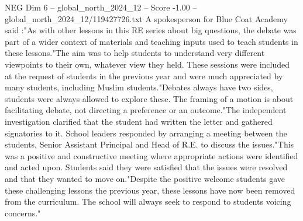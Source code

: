 \begin{textsample}{NEG Dim 6 – global\_north\_2024\_12 – Score -1.00 – global\_north\_2024\_12/119427726.txt}
A spokesperson for Blue Coat Academy said :"As with other lessons in this RE series about big questions, the debate was part of a wider context of materials and teaching inputs used to teach students in these lessons."The aim was to help students to understand very different viewpoints to their own, whatever view they held.
These sessions were included at the request of students in the previous year and were much appreciated by many students, including Muslim students."Debates always have two sides, students were always allowed to explore these.
The framing of a motion is about facilitating debate, not directing a preference or an outcome."The independent investigation clarified that the student had written the letter and gathered signatories to it.
School leaders responded by arranging a meeting between the students, Senior Assistant Principal and Head of R.E. to discuss the issues."This was a positive and constructive meeting where appropriate actions were identified and acted upon.
Students said they were satisfied that the issues were resolved and that they wanted to move on."Despite the positive welcome students gave these challenging lessons the previous year, these lessons have now been removed from the curriculum.
The school will always seek to respond to students voicing concerns."

\end{textsample}
